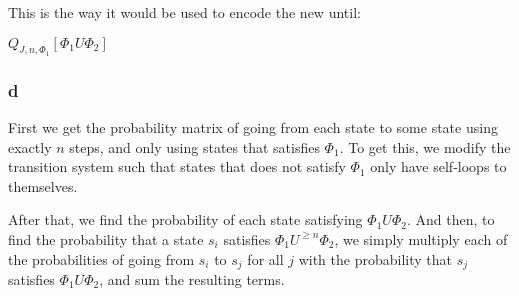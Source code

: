 This is the way it would be used to encode the new until:

$Q_{J, n, \Phi_1} [\Phi_1 U \Phi_2]$

\subsubsection{d}

First we get the probability matrix of going from each state to
some state using exactly $n$ steps,
and only using states that satisfies $\Phi_1$.
To get this, we modify the transition system such that states that does not satisfy
$\Phi_1$ only have self-loops to themselves.

After that, we find the probability of each state satisfying $\Phi_1 U \Phi_2$.
And then, to find the probability that a state $s_i$ satisfies $\Phi_1 U^{\geq n} \Phi_2$,
we simply multiply each of the probabilities of going from $s_i$ to $s_j$ for all $j$ with
the probability that $s_j$ satisfies $\Phi_1 U \Phi_2$, and sum the resulting terms.

